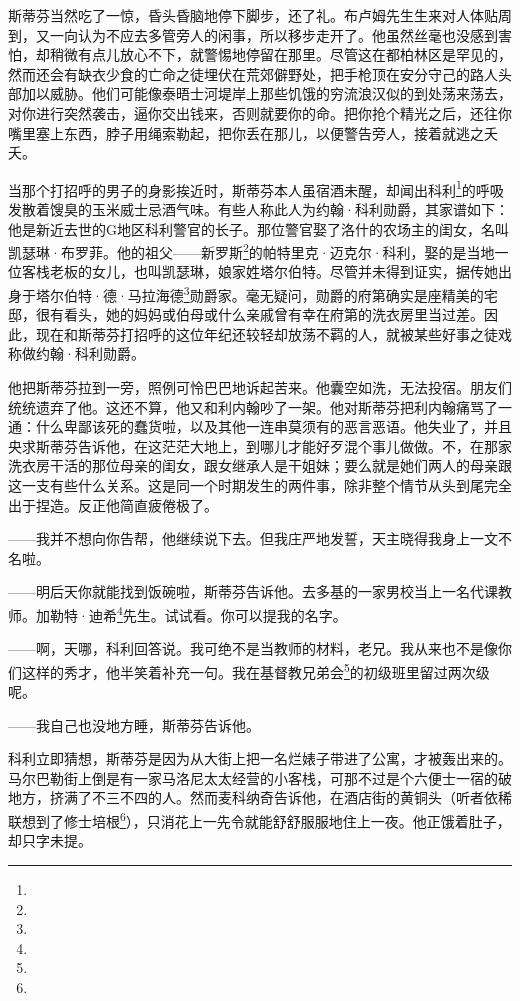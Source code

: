 \par 斯蒂芬当然吃了一惊，昏头昏脑地停下脚步，还了礼。布卢姆先生生来对人体贴周到，又一向认为不应去多管旁人的闲事，所以移步走开了。他虽然丝毫也没感到害怕，却稍微有点儿放心不下，就警惕地停留在那里。尽管这在都柏林区是罕见的，然而还会有缺衣少食的亡命之徒埋伏在荒郊僻野处，把手枪顶在安分守己的路人头部加以威胁。他们可能像泰晤士河堤岸上那些饥饿的穷流浪汉似的到处荡来荡去，对你进行突然袭击，逼你交出钱来，否则就要你的命。把你抢个精光之后，还往你嘴里塞上东西，脖子用绳索勒起，把你丢在那儿，以便警告旁人，接着就逃之夭夭。
\par 当那个打招呼的男子的身影挨近时，斯蒂芬本人虽宿酒未醒，却闻出科利\footnote{}的呼吸发散着馊臭的玉米威士忌酒气味。有些人称此人为约翰·科利勋爵，其家谱如下：他是新近去世的G地区科利警官的长子。那位警官娶了洛什的农场主的闺女，名叫凯瑟琳·布罗菲。他的祖父——新罗斯\footnote{}的帕特里克·迈克尔·科利，娶的是当地一位客栈老板的女儿，也叫凯瑟琳，娘家姓塔尔伯特。尽管并未得到证实，据传她出身于塔尔伯特·德·马拉海德\footnote{}勋爵家。毫无疑问，勋爵的府第确实是座精美的宅邸，很有看头，她的妈妈或伯母或什么亲戚曾有幸在府第的洗衣房里当过差。因此，现在和斯蒂芬打招呼的这位年纪还较轻却放荡不羁的人，就被某些好事之徒戏称做约翰·科利勋爵。
\par 他把斯蒂芬拉到一旁，照例可怜巴巴地诉起苦来。他囊空如洗，无法投宿。朋友们统统遗弃了他。这还不算，他又和利内翰吵了一架。他对斯蒂芬把利内翰痛骂了一通：什么卑鄙该死的蠢货啦，以及其他一连串莫须有的恶言恶语。他失业了，并且央求斯蒂芬告诉他，在这茫茫大地上，到哪儿才能好歹混个事儿做做。不，在那家洗衣房干活的那位母亲的闺女，跟女继承人是干姐妹；要么就是她们两人的母亲跟这一支有些什么关系。这是同一个时期发生的两件事，除非整个情节从头到尾完全出于捏造。反正他简直疲倦极了。
\par ——我并不想向你告帮，他继续说下去。但我庄严地发誓，天主晓得我身上一文不名啦。
\par ——明后天你就能找到饭碗啦，斯蒂芬告诉他。去多基的一家男校当上一名代课教师。加勒特·迪希\footnote{}先生。试试看。你可以提我的名字。
\par ——啊，天哪，科利回答说。我可绝不是当教师的材料，老兄。我从来也不是像你们这样的秀才，他半笑着补充一句。我在基督教兄弟会\footnote{}的初级班里留过两次级呢。
\par ——我自己也没地方睡，斯蒂芬告诉他。
\par 科利立即猜想，斯蒂芬是因为从大街上把一名烂婊子带进了公寓，才被轰出来的。马尔巴勒街上倒是有一家马洛尼太太经营的小客栈，可那不过是个六便士一宿的破地方，挤满了不三不四的人。然而麦科纳奇告诉他，在酒店街的黄铜头（听者依稀联想到了修士培根\footnote{}），只消花上一先令就能舒舒服服地住上一夜。他正饿着肚子，却只字未提。
